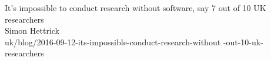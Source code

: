 \documentclass{beamer}
\theoremstyle{definition}
\begin{document}
\begin{frame}
\begin{center}
\huge{It's impossible to conduct research without software, say 7 out of 10
UK researchers} \\
\vspace{10mm}
\large{Simon Hettrick} \\
\vspace{10mm}
\small{uk/blog/2016-09-12-its-impossible-conduct-research-without%
-out-10-uk-researchers}
\end{center}
\end{frame}

\begin{frame}
\begin{center}
   
\end{center}
\end{frame}

\begin{frame}
\begin{center}
    
\end{center}
\end{frame}

\begin{frame}
\begin{center}
    
\end{center}
\end{frame}

\begin{frame}
\begin{center}
     
\end{center}
\end{frame}

\begin{frame}
\begin{center}
    
     \\
    
    
\end{center}
\end{frame}
\end{document}
